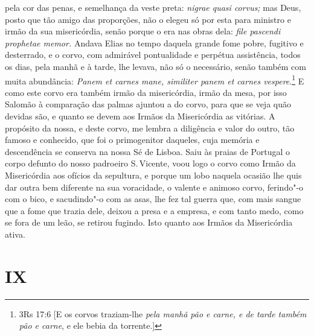 pela cor das penas, e semelhança da veste preta: \emph{nigrae quasi
corvus;} mas Deus, posto que tão amigo das proporções, não o elegeu só
por esta para ministro e irmão da sua misericórdia, senão porque o era
nas obras dela: \emph{file pascendi prophetae memor.} Andava Elias no
tempo daquela grande fome pobre, fugitivo e desterrado, e o corvo, com
admirável pontualidade e perpétua assistência, todos os dias, pela manhã
e à tarde, lhe levava, não só o necessário, senão também com muita
abundância: \emph{Panem et carnes mane, similiter panem et carnes vespere}.\footnote{3Rs 17:6 [E os corvos traziam-lhe \textit{pela manhã pão e carne, e de tarde também pão e carne}, e ele bebia da torrente.]} E como este corvo
era também irmão da misericórdia, irmão da mesa, por isso Salomão à
comparação das palmas ajuntou a do corvo, para que se veja quão devidas
são, e quanto se devem aos Irmãos da Misericórdia as vitórias. A
propósito da nossa, e deste corvo, me lembra a diligência e valor do
outro, tão famoso e conhecido, que foi o primogenitor daqueles, cuja
memória e descendência se conserva na nossa Sé de Lisboa. Saiu às praias
de Portugal o corpo defunto do nosso padroeiro S.\,Vicente, voou logo o
corvo como Irmão da Misericórdia aos ofícios da sepultura, e porque um
lobo naquela ocasião lhe quis dar outra bem diferente na sua voracidade,
o valente e animoso corvo, ferindo"-o com o bico, e sacudindo"-o com as
asas, lhe fez tal guerra que, com mais sangue que a fome que trazia
dele, deixou a presa e a empresa, e com tanto medo, como se fora de um
leão, se retirou fugindo. Isto quanto aos Irmãos da Misericórdia ativa.

\section*{IX}

